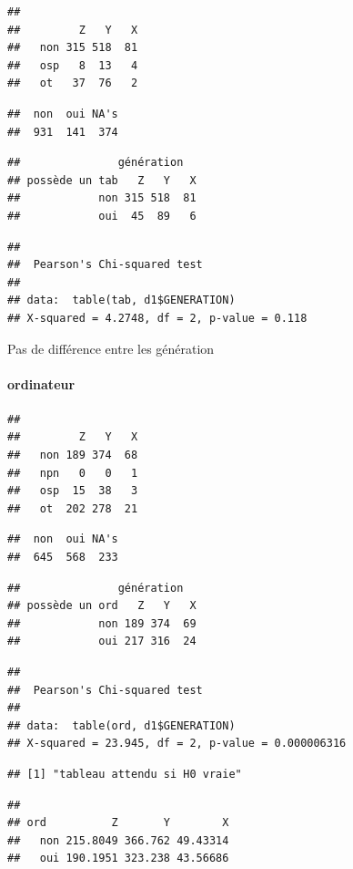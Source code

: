 \documentclass[]{article}
\begin{document}
\begin{verbatim}
##      
##         Z   Y   X
##   non 315 518  81
##   osp   8  13   4
##   ot   37  76   2
\end{verbatim}

\begin{verbatim}
##  non  oui NA's 
##  931  141  374
\end{verbatim}

\begin{verbatim}
##               génération
## possède un tab   Z   Y   X
##            non 315 518  81
##            oui  45  89   6
\end{verbatim}

\begin{verbatim}
## 
##  Pearson's Chi-squared test
## 
## data:  table(tab, d1$GENERATION)
## X-squared = 4.2748, df = 2, p-value = 0.118
\end{verbatim}

Pas de différence entre les génération

\paragraph{ordinateur}\label{ordinateur}

\begin{verbatim}
##      
##         Z   Y   X
##   non 189 374  68
##   npn   0   0   1
##   osp  15  38   3
##   ot  202 278  21
\end{verbatim}

\begin{verbatim}
##  non  oui NA's 
##  645  568  233
\end{verbatim}

\begin{verbatim}
##               génération
## possède un ord   Z   Y   X
##            non 189 374  69
##            oui 217 316  24
\end{verbatim}

\begin{verbatim}
## 
##  Pearson's Chi-squared test
## 
## data:  table(ord, d1$GENERATION)
## X-squared = 23.945, df = 2, p-value = 0.000006316
\end{verbatim}

\begin{verbatim}
## [1] "tableau attendu si H0 vraie"
\end{verbatim}

\begin{verbatim}
##      
## ord          Z       Y        X
##   non 215.8049 366.762 49.43314
##   oui 190.1951 323.238 43.56686
\end{verbatim}
\end{document}
